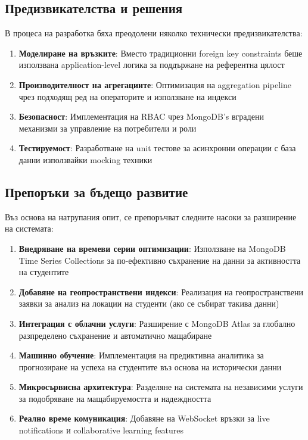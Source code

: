 \subsection{Предизвикателства и решения}

В процеса на разработка бяха преодолени няколко технически предизвикателства:

\begin{enumerate}
    \item \textbf{Моделиране на връзките}: Вместо традиционни foreign key constraints беше използвана application-level логика за поддържане на референтна цялост

    \item \textbf{Производителност на агрегациите}: Оптимизация на aggregation pipeline чрез подходящ ред на операторите и използване на индекси

    \item \textbf{Безопасност}: Имплементация на RBAC чрез MongoDB's вградени механизми за управление на потребители и роли

    \item \textbf{Тестируемост}: Разработване на unit тестове за асинхронни операции с база данни използвайки mocking техники
\end{enumerate}

\subsection{Препоръки за бъдещо развитие}

Въз основа на натрупания опит, се препоръчват следните насоки за разширение на системата:

\begin{enumerate}
    \item \textbf{Внедряване на времеви серии оптимизации}: Използване на MongoDB Time Series Collections за по-ефективно съхранение на данни за активността на студентите

    \item \textbf{Добавяне на геопространствени индекси}: Реализация на геопространствени заявки за анализ на локации на студенти (ако се събират такива данни)

    \item \textbf{Интеграция с облачни услуги}: Разширение с MongoDB Atlas за глобално разпределено съхранение и автоматично мащабиране

    \item \textbf{Машинно обучение}: Имплементация на предиктивна аналитика за прогнозиране на успеха на студентите въз основа на исторически данни

    \item \textbf{Микросървисна архитектура}: Разделяне на системата на независими услуги за подобряване на мащабируемостта и надеждността

    \item \textbf{Реално време комуникация}: Добавяне на WebSocket връзки за live notifications и collaborative learning features
\end{enumerate}

